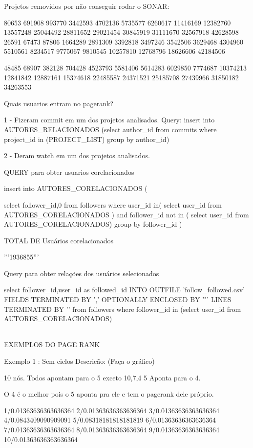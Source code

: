 Projetos removidos por não conseguir rodar o SONAR:


80653
691908
993770
3442593
4702136
5735577
6260617
11416169
12382760
13557248
25044492
28811652
29021454
30845919
31111670
32567918
42628598
26591
67473
87806
1664289
2891309
3392818
3497246
3542506
3629468
4304960
5510561
8234517
9775067
9810545
10257810
12768796
18626606
42184506

48485
68907
382128
704428
4523793
5581406
5614283
6029850
7774687
10374213
12841842
12887161
15374618
22485587
24371521
25185708
27439966
31850182
34263553

Quais usuarios entram no pagerank?

1 - Fizeram commit em um dos projetos analisados.
 Query:  insert into AUTORES_RELACIONADOS 
(select author_id from  commits where project_id in (PROJECT_LIST) group by author_id)

2 - Deram watch em um dos projetos analisados.




QUERY para obter usuarios corelacionados

insert into AUTORES_CORELACIONADOS 
(
  
      select follower_id,0 from followers where user_id in(
            select user_id from AUTORES_CORELACIONADOS
	  ) and follower_id not in ( select user_id from AUTORES_CORELACIONADOS)
group by follower_id
)

TOTAL DE Usuários corelacionados

'''1936855'''


Query para obter relações dos usuários selecionados

select follower_id,user_id as followed_id INTO OUTFILE 'follow_followed.csv'  FIELDS TERMINATED BY ',' OPTIONALLY ENCLOSED BY '"'
  LINES TERMINATED BY '\n' from followers where follower_id in (select user_id from AUTORES_CORELACIONADOS) 



\\ EXEMPLOS DO PAGE RANK

Exemplo 1 :  Sem ciclos
Descricão:  (Faça o gráfico)

10 nós. Todos apontam para o 5 exceto 10,7,4
5 Aponta para o 4.

O 4 é o melhor pois o 5 aponta pra ele e tem o pagerank dele próprio.

1/0.01363636363636364
2/0.01363636363636364
3/0.01363636363636364
4/0.0843409090909091
5/0.08318181818181819
6/0.01363636363636364
7/0.01363636363636364
8/0.01363636363636364
9/0.01363636363636364
10/0.01363636363636364

